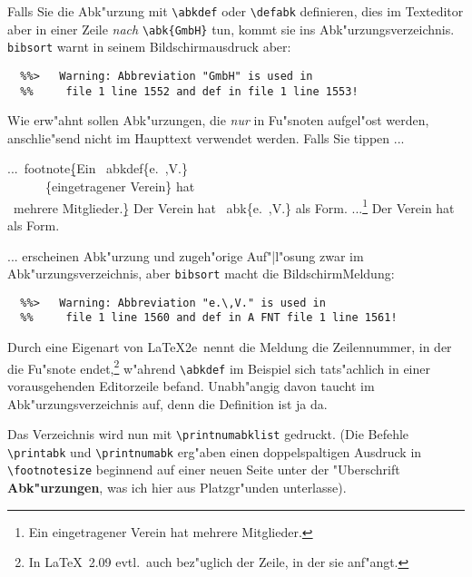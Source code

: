 \documentclass[12pt,a4paper]{article}
\newcommand{\pbs}{\string\ \unskip}
\newcommand{\bs}{\protect\pbs}
\begin{document}
\vspace{-.5ex}\noindent
Falls Sie die Abk"urzung mit \verb|\abkdef| oder
\verb|\defabk| definieren, dies im Texteditor aber in einer 
Zeile \textit{nach} \verb|\abk{GmbH}| tun, kommt sie ins 
Abk"urzungsverzeichnis. \verb|bibsort| warnt in seinem 
Bildschirmausdruck aber:


\vspace{-.5ex}
{\scriptsize\begin{verbatim}
  %%>   Warning: Abbreviation "GmbH" is used in
  %%     file 1 line 1552 and def in file 1 line 1553!
\end{verbatim}}

\vspace{-.5ex}\noindent
Wie erw"ahnt sollen Abk"urzungen, die \textit{nur} in Fu"snoten
aufgel"ost werden, anschlie"send nicht im Haupttext
verwendet werden. Falls Sie tippen ...

\Doppelbox
{...\bs footnote\b{\{}Ein \bs abkdef\{e.\bs,V.\} 
 \\ \ \ \ \ \ \ \{eingetragener Verein\} hat 
 \\ \ mehrere Mitglieder.\b{\}} Der Verein hat \bs abk\{e.\bs,V.\} als Form.
}
{...\footnote{Ein  
 {eingetragener Verein} hat 
 mehrere Mitglieder.} Der Verein hat  als Form.
}

\noindent
... erscheinen Abk"urzung und zugeh"orige Auf"|l"osung zwar im
Abk"urzungsverzeichnis, aber \verb|bibsort| macht die 
Bildschirm\hy Meldung:

{\scriptsize\begin{verbatim}
  %%>   Warning: Abbreviation "e.\,V." is used in
  %%     file 1 line 1560 and def in A FNT file 1 line 1561!
\end{verbatim}}

\noindent
Durch eine Eigenart von \LaTeX2e\ nennt die Meldung
die Zeilennummer, in der die Fu"snote endet,\footnote{In \LaTeX~2.09 evtl.\ auch bez"uglich der Zeile,
in der sie anf"angt.} w"ahrend \verb|\abkdef| im Beispiel sich tats"achlich
in einer vorausgehenden Editorzeile befand. Unabh"angig davon taucht  im 
Abk"urzungsverzeichnis auf, denn die Definition ist ja da. 

Das Verzeichnis
wird nun mit \verb|\printnumabklist| gedruckt. (Die Befehle \verb|\printabk|
und \verb|\printnumabk| erg"aben einen doppelspaltigen Ausdruck in 
\verb|\footnotesize| beginnend auf einer neuen Seite unter der "Uberschrift 
\textbf{Abk"urzungen}, was ich hier aus Platzgr"unden unterlasse).  
\end{document}
